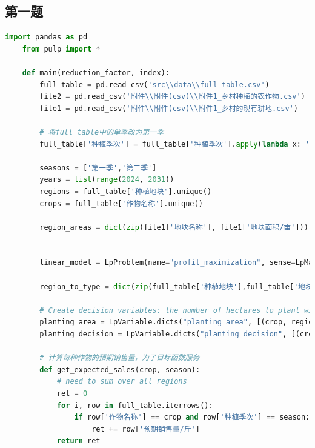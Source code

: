 \documentclass{cumcmthesis}
\begin{document}
\newpage
\begin{appendices}
\section{第一题}
\begin{lstlisting}[language=python]
    import pandas as pd
    from pulp import *
    
    def main(reduction_factor, index):
        full_table = pd.read_csv('src\\data\\full_table.csv')
        file2 = pd.read_csv('附件\\附件(csv)\\附件1_乡村种植的农作物.csv')
        file1 = pd.read_csv('附件\\附件(csv)\\附件1_乡村的现有耕地.csv')
    
        # 将full_table中的单季改为第一季
        full_table['种植季次'] = full_table['种植季次'].apply(lambda x: '第一季' if x == '单季' else x)
    
        seasons = ['第一季','第二季']
        years = list(range(2024, 2031))
        regions = full_table['种植地块'].unique()
        crops = full_table['作物名称'].unique()
    
        region_areas = dict(zip(file1['地块名称'], file1['地块面积/亩']))
    
                
        linear_model = LpProblem(name="profit_maximization", sense=LpMaximize)
        
        region_to_type = dict(zip(full_table['种植地块'],full_table['地块类型']))
    
        # Create decision variables: the number of hectares to plant with [each crop] in [each region] at [each year] at [each season] and the decision to plant or not
        planting_area = LpVariable.dicts("planting_area", [(crop, region, year, season) for crop in crops for region in regions for year in years for season in seasons], lowBound=0, cat='Continuous')
        planting_decision = LpVariable.dicts("planting_decision", [(crop, region, year, season) for crop in crops for region in regions for year in years for season in seasons], cat='Binary')
    
        # 计算每种作物的预期销售量，为了目标函数服务
        def get_expected_sales(crop, season):
            # need to sum over all regions
            ret = 0
            for i, row in full_table.iterrows():
                if row['作物名称'] == crop and row['种植季次'] == season:
                    ret += row['预期销售量/斤']
            return ret
    

\end{lstlisting}
\end{appendices}
\end{document}
